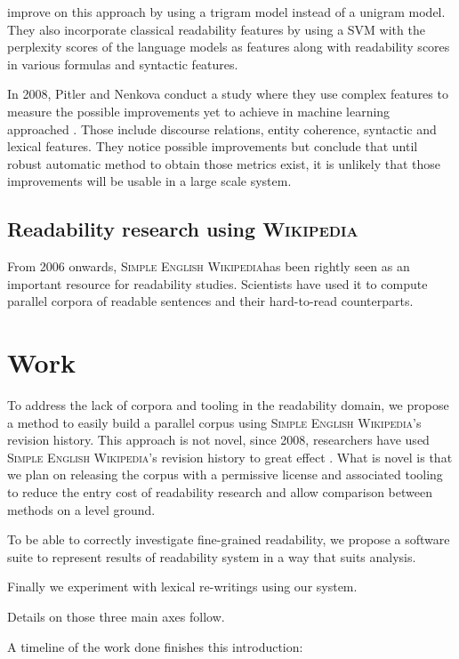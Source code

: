 \documentclass[a4paper, 11pt, onepage]{scrreprt}
\newcommand\wiki{\textsc{Wikipedia}}
\newcommand\sew{\textsc{Simple English Wikipedia}}
\begin{document}
\cite{schwarm2005reading} improve on this approach by using a trigram
model instead of a unigram model. They also incorporate classical
readability features by using a SVM with the perplexity scores of the
language models as features along with readability scores in various
formulas and syntactic features.

In 2008, Pitler and Nenkova conduct a study where they use complex
features to measure the possible improvements yet to achieve in
machine learning approached \cite{pitler2008revisiting}. Those include
discourse relations, entity coherence, syntactic and lexical
features. They notice possible improvements but conclude that until
robust automatic method to obtain those metrics exist, it is unlikely
that those improvements will be usable in a large scale system.

\section{Readability research using \wiki}
\label{sec:wiki-approaches}

From 2006 onwards, \sew has been rightly seen as an important resource
for readability studies. Scientists have used it to compute parallel
corpora of readable sentences and their hard-to-read counterparts.

\chapter{Work}
\label{cha:work}

To address the lack of corpora and tooling in the readability domain,
we propose a method to easily build a parallel corpus using \sew's
revision history. This approach is not novel, since 2008, researchers
have used \sew's revision history to great effect
\cite{nelken2008mining}. What is novel is that we plan on releasing
the corpus with a permissive license and associated tooling to reduce
the entry cost of readability research and allow comparison between
methods on a level ground.

To be able to correctly investigate fine-grained readability, we
propose a software suite to represent results of readability system in
a way that suits analysis.

Finally we experiment with lexical re-writings using our system.

Details on those three main axes follow.

A timeline of the work done finishes this introduction:
\end{document}
